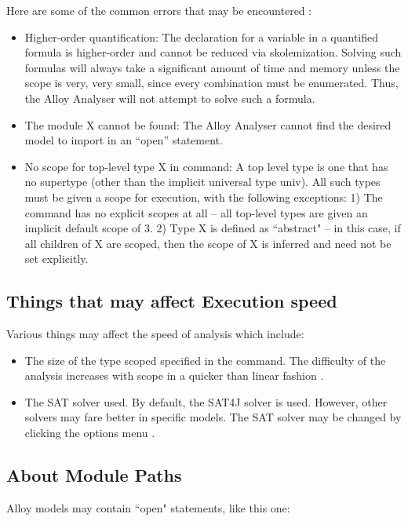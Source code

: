 \documentclass[a4paper,10pt]{report}
\begin{document}
Here are some of the common errors that may be encountered \cite{DanielJackson}:
\begin{itemize}
\item Higher-order quantification: The declaration for a variable in a quantified formula is higher-order and cannot be reduced via skolemization. Solving such formulas will always take a significant amount of time and memory unless the scope is very, very small, since every combination must be enumerated. Thus, the Alloy Analyser will not attempt to solve such a formula.
\item The module X cannot be found: The Alloy Analyser cannot find the desired model to import in an ``open” statement.
\item No scope for top-level type X in command: A top level type is one that has no supertype (other than the implicit universal type univ). All such types must be given a scope for execution, with the following exceptions: 1) The command has no explicit scopes at all – all top-level types are given an implicit default scope of 3.
2) Type X is defined as ``abstract" – in this case, if all children of X are scoped, then the scope of X is inferred and need not be set explicitly.
\end{itemize}

\subsection{Things that may affect Execution speed}
\label{Things affecting execution speed}

Various things may affect the speed of analysis which include:
\begin{itemize}
\item The size of the type scoped specified in the command. The difficulty of the analysis increases with scope in a quicker than linear fashion \cite{DanielJackson}.
\item The SAT solver used. By default, the SAT4J solver is used. However, other solvers may fare better in specific models. The SAT solver may be changed by clicking the options menu \cite{DanielJackson}.
\end{itemize}

\subsection{About Module Paths}
\label{Module Paths}

Alloy models may contain ``open" statements, like this one:
\end{document}
